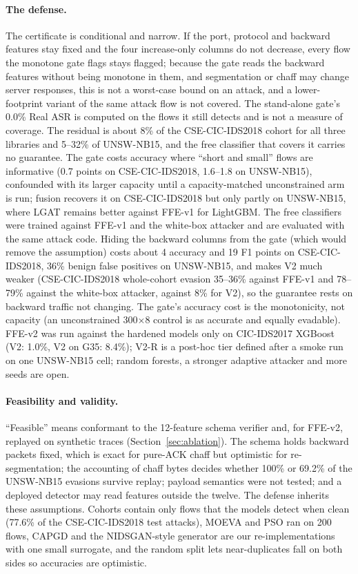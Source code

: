 \paragraph{The defense.} The certificate is conditional and narrow. If the port, protocol and backward features stay fixed and the four increase-only columns do not decrease, every flow the monotone gate flags stays flagged; because the gate reads the backward features without being monotone in them, and segmentation or chaff may change server responses, this is not a worst-case bound on an attack, and a lower-footprint variant of the same attack flow is not covered. The stand-alone gate's 0.0\% Real ASR is computed on the flows it still detects and is not a measure of coverage. The residual is about 8\% of the CSE-CIC-IDS2018 cohort for all three libraries and 5--32\% of UNSW-NB15, and the free classifier that covers it carries no guarantee. The gate costs accuracy where ``short and small'' flows are informative (0.7 points on CSE-CIC-IDS2018, 1.6--1.8 on UNSW-NB15), confounded with its larger capacity until a capacity-matched unconstrained arm is run; fusion recovers it on CSE-CIC-IDS2018 but only partly on UNSW-NB15, where LGAT remains better against FFE-v1 for LightGBM. The free classifiers were trained against FFE-v1 and the white-box attacker and are evaluated with the same attack code. Hiding the backward columns from the gate (which would remove the assumption) costs about 4 accuracy and 19 F1 points on CSE-CIC-IDS2018, 36\% benign false positives on UNSW-NB15, and makes V2 much weaker (CSE-CIC-IDS2018 whole-cohort evasion 35--36\% against FFE-v1 and 78--79\% against the white-box attacker, against 8\% for V2), so the guarantee rests on backward traffic not changing. The gate's accuracy cost is the monotonicity, not capacity (an unconstrained 300$\times$8 control is as accurate and equally evadable). FFE-v2 was run against the hardened models only on CIC-IDS2017 XGBoost (V2: 1.0\%, V2 on G35: 8.4\%); V2-R is a post-hoc tier defined after a smoke run on one UNSW-NB15 cell; random forests, a stronger adaptive attacker and more seeds are open.

\paragraph{Feasibility and validity.} ``Feasible'' means conformant to the 12-feature schema verifier and, for FFE-v2, replayed on synthetic traces (Section~\ref{sec:ablation}). The schema holds backward packets fixed, which is exact for pure-ACK chaff but optimistic for re-segmentation; the accounting of chaff bytes decides whether 100\% or 69.2\% of the UNSW-NB15 evasions survive replay; payload semantics were not tested; and a deployed detector may read features outside the twelve. The defense inherits these assumptions. Cohorts contain only flows that the models detect when clean (77.6\% of the CSE-CIC-IDS2018 test attacks), MOEVA and PSO ran on 200 flows, CAPGD and the NIDSGAN-style generator are our re-implementations with one small surrogate, and the random split lets near-duplicates fall on both sides so accuracies are optimistic.

